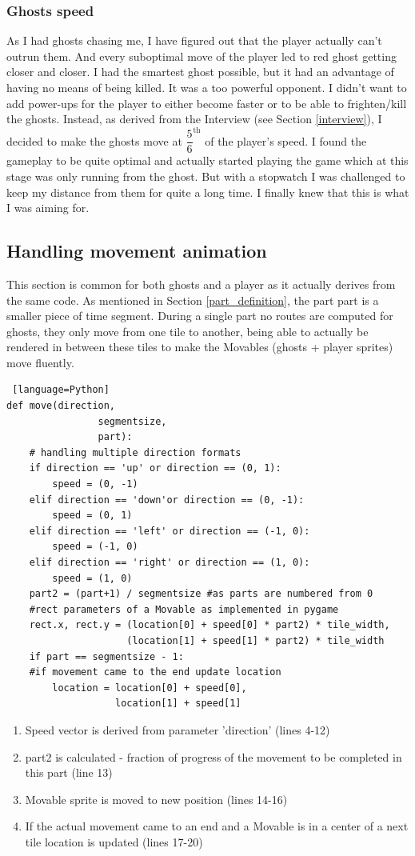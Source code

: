 \documentclass[11pt,a4paper]{report}
\newcommand{\dsubsection}[1]{\FloatBarrier \subsection{#1}}
\begin{document}
				\subsubsection{Ghosts speed}
					As I had ghosts chasing me, I have figured out that the player actually can't outrun them. And every suboptimal move of the player led to red ghost getting closer and closer. I had the smartest ghost possible, but it had an advantage of having no means of being killed. It was a too powerful opponent. I didn't want to add power-ups for the player to either become faster or to be able to frighten/kill the ghosts. Instead, as derived from the Interview (see Section \ref{interview}), I decided to make the ghosts move at $\dfrac{5}{6}^{\text{th}}$ of the player's speed. I found the gameplay to be quite optimal and actually started playing the game which at this stage was only running from the ghost. But with a stopwatch I was challenged to keep my distance from them for quite a long time. I finally knew that this is what I was aiming for.
			\dsubsection{Handling movement animation}
				This section is common for both ghosts and a player as it actually derives from the same code. As mentioned in Section \ref{part_definition}, the part part is a smaller piece of time segment. During a single part no routes are computed for ghosts, they only move from one tile to another, being able to actually be rendered in between these tiles to make the Movables (ghosts + player sprites) move fluently.
				\begin{lstlisting} [language=Python]
def move(direction,
				segmentsize,
				part):
	# handling multiple direction formats
    if direction == 'up' or direction == (0, 1):
        speed = (0, -1)
    elif direction == 'down'or direction == (0, -1):
        speed = (0, 1)
    elif direction == 'left' or direction == (-1, 0):
        speed = (-1, 0)
    elif direction == 'right' or direction == (1, 0):
        speed = (1, 0)
    part2 = (part+1) / segmentsize #as parts are numbered from 0
    #rect parameters of a Movable as implemented in pygame
    rect.x, rect.y = (location[0] + speed[0] * part2) * tile_width,
                     (location[1] + speed[1] * part2) * tile_width
    if part == segmentsize - 1:
    #if movement came to the end update location
        location = location[0] + speed[0],
                   location[1] + speed[1]
				\end{lstlisting}
				\begin{enumerate}
					\item
						Speed vector is derived from parameter 'direction' (lines 4-12)
					\item
						part2 is calculated - fraction of progress of the movement to be completed in this part (line 13)\
					\item
						Movable sprite is moved to new position (lines 14-16)
					\item
						If the actual movement came to an end and a Movable is in a center of a next tile location is updated (lines 17-20)
				\end{enumerate}
\end{document}
